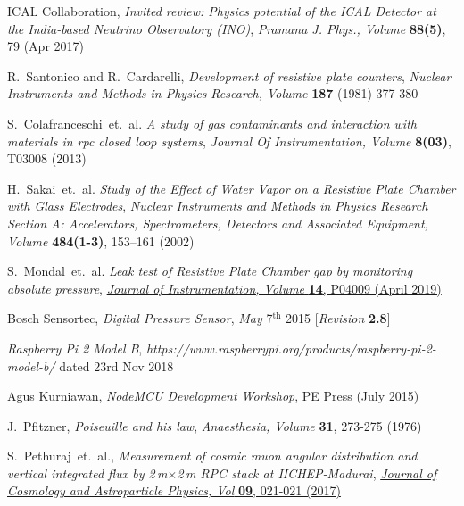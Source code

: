 \documentclass[a4paper,12pt,twoside,openany]{article}
\begin{document}
\begin{thebibliography}{9}

  ICAL Collaboration,  \emph{Invited review: Physics potential of the ICAL Detector at the India-based Neutrino Observatory (INO)}, \emph{Pramana J. Phys., Volume } \textbf{88(5)}, 79 (Apr 2017)
  
  
  R.~Santonico and R.~Cardarelli, \emph{Development of resistive plate counters}, \emph{Nuclear Instruments and Methods in Physics Research, Volume} \textbf{187} (1981) 377-380

  S.~Colafranceschi~et.~al. \emph{A study of gas contaminants and interaction with materials in rpc closed loop systems}, \emph{Journal Of Instrumentation, Volume } \textbf{8(03)}, T03008 (2013)

  H.~Sakai~et.~al. \emph{Study of the Effect of Water Vapor on a Resistive Plate Chamber with Glass Electrodes}, \emph{Nuclear Instruments and Methods in Physics Research Section A: Accelerators, Spectrometers, Detectors and Associated Equipment, Volume } \textbf{484(1-3)}, 153--161 (2002)

  S.~Mondal~et.~al. \emph{Leak test of Resistive Plate Chamber gap by monitoring absolute pressure}, \href{https://doi.org/10.1088/1748-0221/14/04/P04009}{\emph{Journal of Instrumentation, Volume } \textbf{14}, P04009 (April 2019)}

  Bosch Sensortec, \emph{Digital Pressure Sensor}, \emph{May} 7$^\mathrm{th}$ 2015 [\emph{Revision} \textbf{2.8}]

  \emph{Raspberry Pi 2 Model B}, \emph{https://www.raspberrypi.org/products/raspberry-pi-2-model-b/} dated 23rd Nov 2018
    
  Agus Kurniawan, \emph{NodeMCU Development Workshop}, PE Press (July 2015)

  J.~Pfitzner, \emph{Poiseuille and his law}, \emph{Anaesthesia, Volume } \textbf{31}, 273-275 (1976)
  
  
  S.~Pethuraj~et.~al., \emph{Measurement of cosmic muon angular distribution and vertical integrated flux by 2\,m$\times$2\,m {RPC} stack at {IICHEP}-Madurai}, \href{https://doi.org/10.1088/1475-7516/2017/09/021}{\emph{Journal of Cosmology and Astroparticle Physics, Vol} \textbf{09}, 021-021 (2017)}
  

\end{thebibliography}
\end{document}
